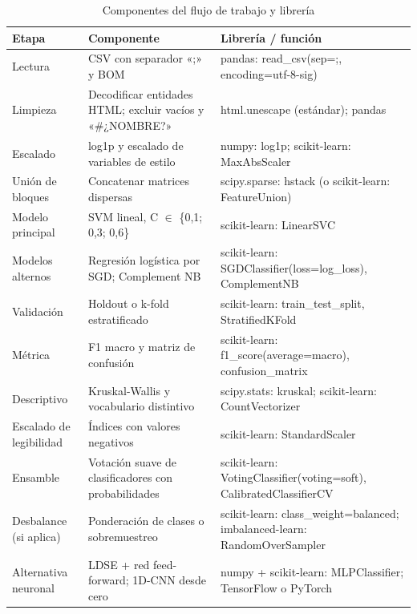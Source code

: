 \documentclass[10pt,twocolumn]{article}
\begin{document}
\begin{table}[!t]
\centering\scriptsize
\caption{Componentes del flujo de trabajo y librería}\label{tab:7}
\renewcommand{\arraystretch}{1.15}
\begin{tabular}{p{}p{}p{}}
\hline
\raggedright\textbf{Etapa} & \raggedright\textbf{Componente} & \raggedright\textbf{Librería / función} \tabularnewline \hline
\raggedright Lectura & \raggedright CSV con separador «;» y BOM & \raggedright pandas: read\_csv(sep=\textquotedbl{};\textquotedbl{}, encoding=\textquotedbl{}utf-8-sig\textquotedbl{}) \tabularnewline
\raggedright Limpieza & \raggedright Decodificar entidades HTML; excluir vacíos y «\#¿NOMBRE?» & \raggedright html.unescape (estándar); pandas \tabularnewline
\raggedright Escalado & \raggedright log1p y escalado de variables de estilo & \raggedright numpy: log1p; scikit-learn: MaxAbsScaler \tabularnewline
\raggedright Unión de bloques & \raggedright Concatenar matrices dispersas & \raggedright scipy.sparse: hstack (o scikit-learn: FeatureUnion) \tabularnewline
\raggedright Modelo principal & \raggedright SVM lineal, C $\in$ \{0,1; 0,3; 0,6\} & \raggedright scikit-learn: LinearSVC \tabularnewline
\raggedright Modelos alternos & \raggedright Regresión logística por SGD; Complement NB & \raggedright scikit-learn: SGDClassifier(loss=\textquotedbl{}log\_loss\textquotedbl{}), ComplementNB \tabularnewline
\raggedright Validación & \raggedright Holdout o k-fold estratificado & \raggedright scikit-learn: train\_test\_split, StratifiedKFold \tabularnewline
\raggedright Métrica & \raggedright F1 macro y matriz de confusión & \raggedright scikit-learn: f1\_score(average=\textquotedbl{}macro\textquotedbl{}), confusion\_matrix \tabularnewline
\raggedright Descriptivo & \raggedright Kruskal-Wallis y vocabulario distintivo & \raggedright scipy.stats: kruskal; scikit-learn: CountVectorizer \tabularnewline
\raggedright Escalado de legibilidad & \raggedright Índices con valores negativos & \raggedright scikit-learn: StandardScaler \tabularnewline
\raggedright Ensamble & \raggedright Votación suave de clasificadores con probabilidades & \raggedright scikit-learn: VotingClassifier(voting=\textquotedbl{}soft\textquotedbl{}), CalibratedClassifierCV \tabularnewline
\raggedright Desbalance (si aplica) & \raggedright Ponderación de clases o sobremuestreo & \raggedright scikit-learn: class\_weight=\textquotedbl{}balanced\textquotedbl{}; imbalanced-learn: RandomOverSampler \tabularnewline
\raggedright Alternativa neuronal & \raggedright LDSE + red feed-forward; 1D-CNN desde cero & \raggedright numpy + scikit-learn: MLPClassifier; TensorFlow o PyTorch \tabularnewline
\hline
\end{tabular}
\end{table}
\end{document}
